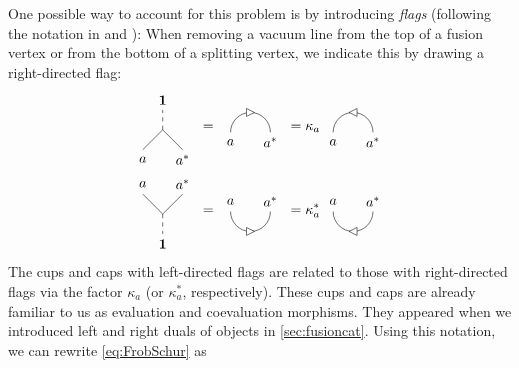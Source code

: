 One possible way to account for this problem is by introducing \emph{flags} (following the notation in \cite{kitaev_anyons_2006} and \cite{Bond2007}): When removing a vacuum line from the top of a fusion vertex or from the bottom of a splitting vertex, we indicate this by drawing a right-directed flag:
	\begin{align}
	\label{eq:evaluationcat}
		\begin{tikzpicture}[baseline=(current bounding box.center)]
			\draw (0,0) -- (0.5,0.5) -- (1,0);
			\draw[dashed] (0.5,0.5) -- (0.5,1);
			\node at (0,-0.25) {$a$};
			\node at (1,-0.25) {$a^*$};
			\node at (0.5,1.25) {$\mathbf{1}$};
		\end{tikzpicture}\ &=\ 
		\begin{tikzpicture}[baseline=(current bounding box.center)]
			\draw (0,0) arc (180:0:0.5);
			\draw[fill=white] (0.6,0.5) -- (0.4,0.6) -- (0.4,0.4) -- cycle;
			\node at (0,-0.25) {$a$};
			\node at (1,-0.25) {$a^*$};
		\end{tikzpicture}\ =\kappa_a\ 
		\begin{tikzpicture}[baseline=(current bounding box.center)]
			\draw (0,0) arc (180:0:0.5);
			\draw[fill=white] (0.4,0.5) -- (0.6,0.4) -- (0.6,0.6) -- cycle;
			\node at (0,-0.25) {$a$};
			\node at (1,-0.25) {$a^*$};
		\end{tikzpicture}\\
		\label{eq:coevaluationcat}
		\begin{tikzpicture}[baseline=(current bounding box.center),yscale=-1]
			\draw (0,0) -- (0.5,0.5) -- (1,0);
			\draw[dashed] (0.5,0.5) -- (0.5,1);
			\node at (0,-0.25) {$a$};
			\node at (1,-0.25) {$a^*$};
			\node at (0.5,1.25) {$\mathbf{1}$};
		\end{tikzpicture}\ &=\ 
		\begin{tikzpicture}[baseline=(current bounding box.center),yscale=-1]
			\draw (0,0) arc (180:0:0.5);
			\draw[fill=white] (0.6,0.5) -- (0.4,0.6) -- (0.4,0.4) -- cycle;
			\node at (0,-0.25) {$a$};
			\node at (1,-0.25) {$a^*$};
		\end{tikzpicture}\ =\kappa_a^*\ 
		\begin{tikzpicture}[baseline=(current bounding box.center),yscale=-1]
			\draw (0,0) arc (180:0:0.5);
			\draw[fill=white] (0.4,0.5) -- (0.6,0.4) -- (0.6,0.6) -- cycle;
			\node at (0,-0.25) {$a$};
			\node at (1,-0.25) {$a^*$};
		\end{tikzpicture}
	\end{align}
The cups and caps with left-directed flags are related to those with right-directed flags via the factor $\kappa_a$ (or $\kappa_a^*$, respectively). These cups and caps are already familiar to us as evaluation and coevaluation morphisms. They appeared when we introduced left and right duals of objects in \cref{sec:fusioncat}. Using this notation, we can rewrite \cref{eq:FrobSchur} as
